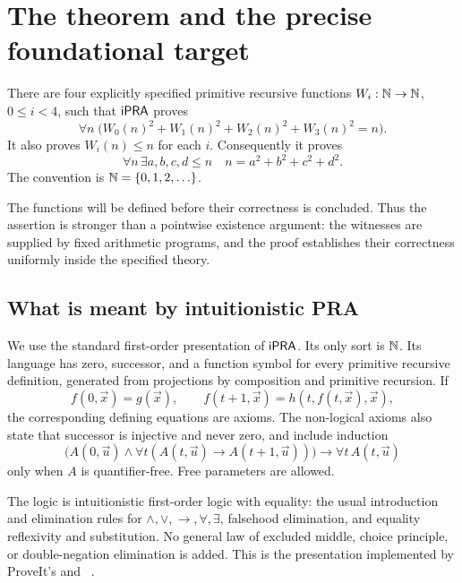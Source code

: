 \section{The theorem and the precise foundational target}
\label{sec:foundations}

\begin{theorem}
\label{thm:main}
There are four explicitly specified primitive recursive functions
$W_i:\mathbb N\to\mathbb N$, $0\le i<4$, such that $\mathsf{iPRA}$ proves
\begin{equation}
\label{eq:main}
 \forall n\;\bigl(W_0(n)^2+W_1(n)^2+W_2(n)^2+W_3(n)^2=n\bigr).
\end{equation}
It also proves $W_i(n)\le n$ for each $i$. Consequently it proves
\begin{equation}
\label{eq:exists}
 \forall n\,\exists a,b,c,d\le n\quad n=a^2+b^2+c^2+d^2.
\end{equation}
The convention is $\mathbb N=\{0,1,2,\ldots\}$.
\end{theorem}

The functions will be defined before their correctness is concluded. Thus
the assertion is stronger than a pointwise existence argument: the witnesses
are supplied by fixed arithmetic programs, and the proof establishes their
correctness uniformly inside the specified theory.

\subsection{What is meant by intuitionistic PRA}

We use the standard first-order presentation of $\mathsf{iPRA}$. Its only sort is
$\mathbb N$. Its language has zero, successor, and a function symbol for every
primitive recursive definition, generated from projections by composition
and primitive recursion. If
\[
 f(0,\vec x)=g(\vec x),\qquad
 f(t+1,\vec x)=h(t,f(t,\vec x),\vec x),
\]
the corresponding defining equations are axioms. The non-logical axioms
also state that successor is injective and never zero, and include induction
\[
 \bigl(A(0,\vec u)\land
       \forall t(A(t,\vec u)\to A(t+1,\vec u))\bigr)
 \to \forall t\,A(t,\vec u)
\]
only when $A$ is quantifier-free. Free parameters are allowed.

The logic is intuitionistic first-order logic with equality: the usual
introduction and elimination rules for $\land,\lor,\to,\forall,\exists$,
falsehood elimination, and equality reflexivity and substitution. No general
law of excluded middle, choice principle, or double-negation elimination is
added. This is the presentation implemented by ProveIt's
 and ~\cite{proveit}.

